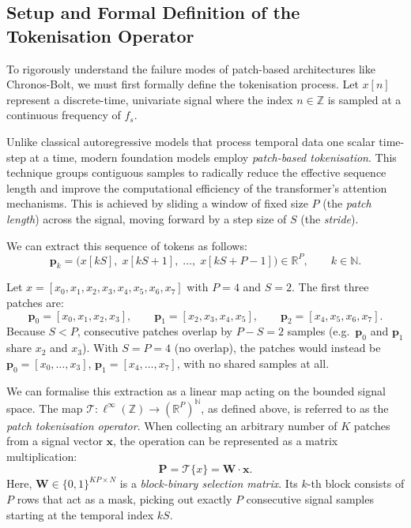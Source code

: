 \subsection{Setup and Formal Definition of the Tokenisation Operator}


To rigorously understand the failure modes of patch-based architectures like Chronos-Bolt,
we must first formally define the tokenisation process.
Let $x[n]$ represent a discrete-time, univariate signal where the index $n \in \mathbb{Z}$
is sampled at a continuous frequency of $f_s$.

Unlike classical autoregressive models that process temporal data one scalar time-step at a
time, modern foundation models employ \emph{patch-based tokenisation}.
This technique groups contiguous samples to radically reduce the effective sequence length
and improve the computational efficiency of the transformer's attention mechanisms.
This is achieved by sliding a window of fixed size $P$ (the \emph{patch length}) across the
signal, moving forward by a step size of $S$ (the \emph{stride}).

We can extract this sequence of tokens as follows:
\begin{equation}
	\mathbf{p}_k
	= \bigl(x[kS],\; x[kS+1],\; \ldots,\; x[kS+P-1]\bigr)
	\in \mathbb{R}^P,
	\qquad k \in \mathbb{N}.
\end{equation}

\begin{example}
	Let $x = [x_0, x_1, x_2, x_3, x_4, x_5, x_6, x_7]$ with $P = 4$ and $S = 2$.
	The first three patches are:
	\[
	\mathbf{p}_0 = [x_0,x_1,x_2,x_3], \qquad
	\mathbf{p}_1 = [x_2,x_3,x_4,x_5], \qquad
	\mathbf{p}_2 = [x_4,x_5,x_6,x_7].
	\]
	Because $S < P$, consecutive patches overlap by $P - S = 2$ samples
	(e.g.\ $\mathbf{p}_0$ and $\mathbf{p}_1$ share $x_2$ and $x_3$).
	With $S = P = 4$ (no overlap), the patches would instead be
	$\mathbf{p}_0{=}[x_0,\ldots,x_3]$, $\mathbf{p}_1{=}[x_4,\ldots,x_7]$,
	with no shared samples at all.
\end{example}

\begin{definition}
	We can formalise this extraction as a linear map acting on the bounded signal space.
	The map $\mathcal{T}: \ell^\infty(\mathbb{Z}) \to (\mathbb{R}^P)^{\mathbb{N}}$,
	as defined above, is referred to as the \emph{patch tokenisation operator}.
	When collecting an arbitrary number of $K$ patches from a signal vector $\mathbf{x}$,
	the operation can be represented as a matrix multiplication:
	\begin{equation}
		\mathbf{P} = \mathcal{T}\{x\} = \mathbf{W} \cdot \mathbf{x}.
	\end{equation}
	Here, $\mathbf{W} \in \{0,1\}^{KP \times N}$ is a \emph{block-binary selection matrix}.
	Its $k$-th block consists of $P$ rows that act as a mask, picking out exactly $P$
	consecutive signal samples starting at the temporal index $kS$.
\end{definition}

